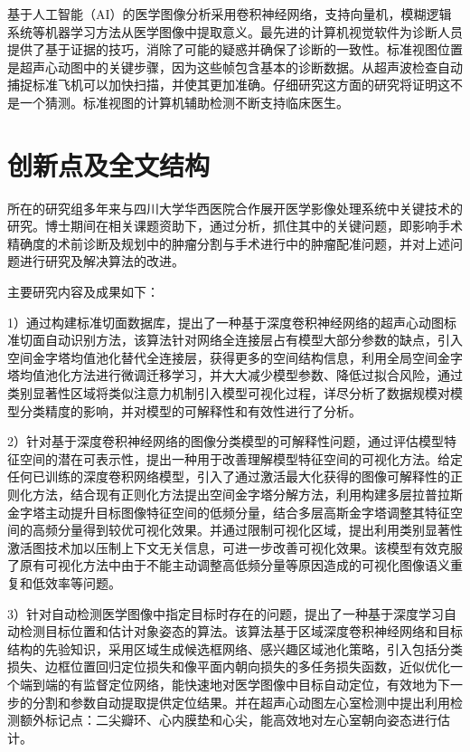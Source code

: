 基于人工智能（AI）的医学图像分析采用卷积神经网络，支持向量机，模糊逻辑系统等机器学习方法从医学图像中提取意义。最先进的计算机视觉软件为诊断人员提供了基于证据的技巧，消除了可能的疑惑并确保了诊断的一致性。标准视图位置是超声心动图中的关键步骤，因为这些帧包含基本的诊断数据。从超声波检查自动捕捉标准飞机可以加快扫描，并使其更加准确。仔细研究这方面的研究将证明这不是一个猜测。标准视图的计算机辅助检测不断支持临床医生。

\section{创新点及全文结构}

所在的研究组多年来与四川大学华西医院合作展开医学影像处理系统中关键技术的研究。博士期间在相关课题资助下，通过分析，抓住其中的关键问题，即影响手术精确度的术前诊断及规划中的肿瘤分割与手术进行中的肿瘤配准问题，并对上述问题进行研究及解决算法的改进。

主要研究内容及成果如下：

1）通过构建标准切面数据库，提出了一种基于深度卷积神经网络的超声心动图标准切面自动识别方法，该算法针对网络全连接层占有模型大部分参数的缺点，引入空间金字塔均值池化替代全连接层，获得更多的空间结构信息，利用全局空间金字塔均值池化方法进行微调迁移学习，并大大减少模型参数、降低过拟合风险，通过类别显著性区域将类似注意力机制引入模型可视化过程，详尽分析了数据规模对模型分类精度的影响，并对模型的可解释性和有效性进行了分析。

2）针对基于深度卷积神经网络的图像分类模型的可解释性问题，通过评估模型特征空间的潜在可表示性，提出一种用于改善理解模型特征空间的可视化方法。给定任何已训练的深度卷积网络模型，引入了通过激活最大化获得的图像可解释性的正则化方法，结合现有正则化方法提出空间金字塔分解方法，利用构建多层拉普拉斯金字塔主动提升目标图像特征空间的低频分量，结合多层高斯金字塔调整其特征空间的高频分量得到较优可视化效果。并通过限制可视化区域，提出利用类别显著性激活图技术加以压制上下文无关信息，可进一步改善可视化效果。该模型有效克服了原有可视化方法中由于不能主动调整高低频分量等原因造成的可视化图像语义重复和低效率等问题。

3）针对自动检测医学图像中指定目标时存在的问题，提出了一种基于深度学习自动检测目标位置和估计对象姿态的算法。该算法基于区域深度卷积神经网络和目标结构的先验知识，采用区域生成候选框网络、感兴趣区域池化策略，引入包括分类损失、边框位置回归定位损失和像平面内朝向损失的多任务损失函数，近似优化一个端到端的有监督定位网络，能快速地对医学图像中目标自动定位，有效地为下一步的分割和参数自动提取提供定位结果。并在超声心动图左心室检测中提出利用检测额外标记点：二尖瓣环、心内膜垫和心尖，能高效地对左心室朝向姿态进行估计。

